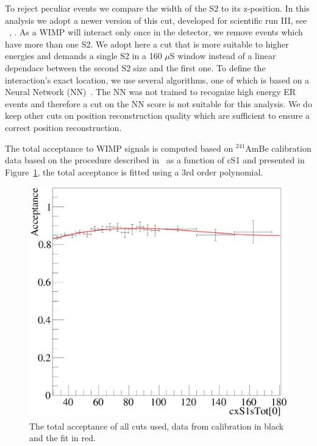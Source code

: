 To reject peculiar events we compare the width of the S2 to its z-position. In this analysis we adopt a newer version of this cut, developed for scientific run III, see ~\cite{xe100_run_combination},  . As a WIMP will interact only once in the detector, we remove events which have more than one S2. We adopt here a cut that is more suitable to higher energies and demands a single S2 in a 160 $\mu$S window instead of a linear dependace between the second S2 size and the first one. To define the interaction's exact location, we use several algorithms, one of which is based on a Neural Network (NN)~\cite{Aprile:2012vw}. The NN was not trained to recognize high energy ER events and therefore a cut on the NN score is not suitable for this analysis. We do keep other cuts on position reconstruction quality which are sufficient to ensure a correct position reconstruction. 

The total acceptance to WIMP signals is computed based on $^{241}$AmBe calibration data based on  the procedure described in~\cite{Aprile:2012vw} as a function of cS1
 and presented  in Figure~\ref{fig:Acc}, the total acceptance is fitted using a 3rd order polynomial.

\begin{figure}[t!]
\begin{minipage}{0.9\linewidth}
\centerline{\includegraphics[width=1.\linewidth]{Figures/Acceptance.eps}}
\end{minipage}
\caption{The total acceptance of all cuts used, data from calibration in black and the fit in red.}
\label{fig:Acc}
\end{figure}

